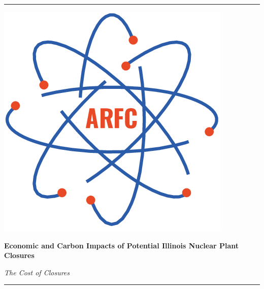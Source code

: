 \begin{titlepage} %
    \newcommand{\HRule}{\rule{\linewidth}{0.5mm}} %
    
    \center %

    \HRule
    \vspace{0.2cm}
     \begin{minipage}{0.4\textwidth}
        \includegraphics[width=\textwidth]{./img/arfc-logo.png}
        \end{minipage}%
        \begin{minipage}{0.6\textwidth}
        {\begin{flushright}\huge\bfseries Economic and Carbon Impacts of Potential Illinois Nuclear Plant Closures\end{flushright}}
        {\begin{flushright}\large\textit{The Cost of Closures}\end{flushright}}
        \end{minipage}

    \vspace{0.2cm}
    \HRule
    \vspace{0.5cm}
    

\end{titlepage}
